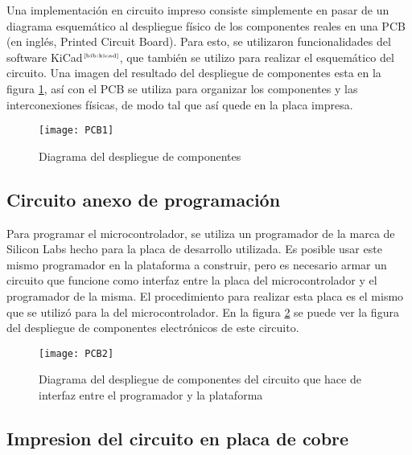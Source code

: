 Una implementación en circuito impreso consiste simplemente en pasar de un diagrama esquemático al despliegue físico de los componentes reales en una PCB (en inglés, Printed Circuit Board). Para esto, se utilizaron funcionalidades del software KiCad$^{\tiny{\cite{bib:kicad}}}$, que también se utilizo para realizar el esquemático del circuito. Una imagen del resultado del despliegue de componentes esta en la figura \ref{fig:PCB1}, así con el PCB se utiliza para organizar los componentes y las interconexiones físicas, de modo tal que así quede en la placa impresa.

\begin{figure}[H]
  \centering
  \texttt{[image: PCB1]}
  \caption{\small Diagrama del despliegue de componentes}\label{fig:PCB1}
\end{figure}


\subsection{Circuito anexo de programación} %
\label{sub:circuito_anexo_de_programacion}

Para programar el microcontrolador, se utiliza un programador de la marca de Silicon Labs hecho para la placa de desarrollo utilizada. Es posible usar este mismo programador en la plataforma a construir, pero es necesario armar un circuito que funcione como interfaz entre la placa del microcontrolador y el programador de la misma. El procedimiento para realizar esta placa es el mismo que se utilizó para la del microcontrolador. En la figura \ref{fig:PCB2} se puede ver la figura del despliegue de componentes electrónicos de este circuito.

\begin{figure}[H]
  \centering
  \texttt{[image: PCB2]}
  \caption{\small Diagrama del despliegue de componentes del circuito que hace de interfaz entre el programador y la plataforma}\label{fig:PCB2}
\end{figure}


\subsection{Impresion del circuito en placa de cobre} %
\label{sub:impresion_del_circuito_en_placa_de_cobre}

